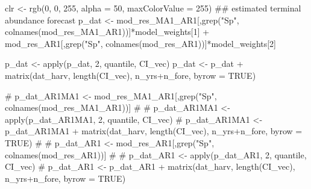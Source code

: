 \documentclass[
  11pt,
]{article}
\newenvironment{Shaded}{}{}
\newcommand{\CommentTok}[1]{\textcolor[rgb]{0.00,0.50,0.00}{#1}}
\newcommand{\DataTypeTok}[1]{#1}
\newcommand{\DecValTok}[1]{#1}
\newcommand{\KeywordTok}[1]{\textcolor[rgb]{0.00,0.00,1.00}{#1}}
\newcommand{\NormalTok}[1]{#1}
\newcommand{\OperatorTok}[1]{#1}
\newcommand{\OtherTok}[1]{\textcolor[rgb]{1.00,0.25,0.00}{#1}}
\newcommand{\StringTok}[1]{\textcolor[rgb]{0.00,0.50,0.50}{#1}}
\begin{document}
\begin{Shaded}
\begin{Highlighting}[]
\NormalTok{clr <-}\StringTok{ }\KeywordTok{rgb}\NormalTok{(}\DecValTok{0}\NormalTok{, }\DecValTok{0}\NormalTok{, }\DecValTok{255}\NormalTok{, }\DataTypeTok{alpha =} \DecValTok{50}\NormalTok{, }\DataTypeTok{maxColorValue =} \DecValTok{255}\NormalTok{)}
\CommentTok{## estimated terminal abundance forecast}
\NormalTok{p_dat <-}\StringTok{ }\NormalTok{mod_res_MA1_AR1[,}\KeywordTok{grep}\NormalTok{(}\StringTok{"Sp"}\NormalTok{, }\KeywordTok{colnames}\NormalTok{(mod_res_MA1_AR1))]}\OperatorTok{*}\NormalTok{model_weights[}\DecValTok{1}\NormalTok{] }\OperatorTok{+}\StringTok{ }\NormalTok{mod_res_AR1[,}\KeywordTok{grep}\NormalTok{(}\StringTok{"Sp"}\NormalTok{, }\KeywordTok{colnames}\NormalTok{(mod_res_AR1))]}\OperatorTok{*}\NormalTok{model_weights[}\DecValTok{2}\NormalTok{]}

\NormalTok{p_dat <-}\StringTok{ }\KeywordTok{apply}\NormalTok{(p_dat, }\DecValTok{2}\NormalTok{, quantile, CI_vec)}
\NormalTok{p_dat <-}\StringTok{ }\NormalTok{p_dat }\OperatorTok{+}\StringTok{ }\KeywordTok{matrix}\NormalTok{(dat_harv, }\KeywordTok{length}\NormalTok{(CI_vec), n_yrs}\OperatorTok{+}\NormalTok{n_fore, }\DataTypeTok{byrow =} \OtherTok{TRUE}\NormalTok{)}


\CommentTok{# p_dat_AR1MA1 <- mod_res_MA1_AR1[,grep("Sp", colnames(mod_res_MA1_AR1))]}
\CommentTok{# }
\CommentTok{# p_dat_AR1MA1 <- apply(p_dat_AR1MA1, 2, quantile, CI_vec)}
\CommentTok{# p_dat_AR1MA1 <- p_dat_AR1MA1 + matrix(dat_harv, length(CI_vec), n_yrs+n_fore, byrow = TRUE)}
\CommentTok{# }
\CommentTok{# p_dat_AR1 <- mod_res_AR1[,grep("Sp", colnames(mod_res_AR1))]}
\CommentTok{# }
\CommentTok{# p_dat_AR1 <- apply(p_dat_AR1, 2, quantile, CI_vec)}
\CommentTok{# p_dat_AR1 <- p_dat_AR1 + matrix(dat_harv, length(CI_vec), n_yrs+n_fore, byrow = TRUE)}


\end{Highlighting}
\end{Shaded}
\end{document}
